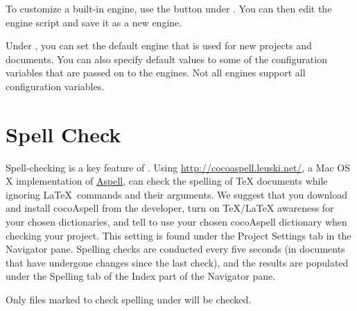 
To customize a built-in engine, use the  button under . You can then edit the engine script and save it as a new engine.

Under , you can set the default engine that is used for new projects and documents. You can also specify default values to some of the configuration variables that are passed on to the engines. Not all engines support all configuration variables.

\section{Spell Check}
\label{reference.spellcheck}
Spell-checking is a key feature of \texnicle. Using \href{http://cocoaspell.leuki.com}{http://cocoaspell.leuski.net/}, a Mac OS X implementation of \href{http://aspell.net/}{Aspell}, \texnicle can check the spelling of {\TeX} documents while ignoring \LaTeX\ commands and their arguments. We suggest that you download and install cocoAspell from the developer, turn on {\TeX/\LaTeX} awareness for your chosen dictionaries, and tell \texnicle to use your chosen cocoAspell dictionary when checking your project. This setting is found under the Project Settings tab in the Navigator pane. Spelling checks are conducted every five seconds (in documents that have undergone changes since the last check), and the results are populated under the Spelling tab of the Index part of the Navigator pane.

Only files marked to check spelling under  will be checked.

